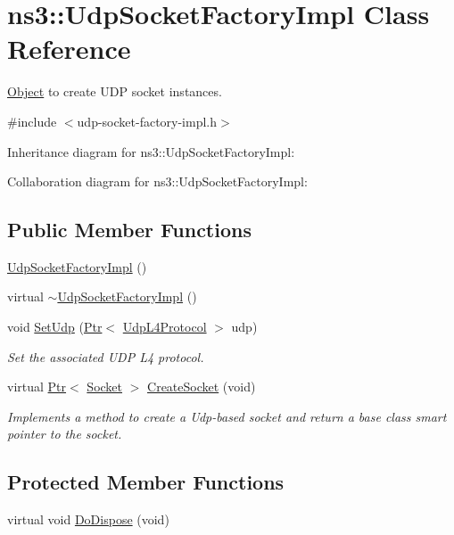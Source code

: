 \hypertarget{classns3_1_1UdpSocketFactoryImpl}{}\section{ns3\+:\+:Udp\+Socket\+Factory\+Impl Class Reference}
\label{classns3_1_1UdpSocketFactoryImpl}


\hyperlink{classns3_1_1Object}{Object} to create U\+DP socket instances.  




{\ttfamily \#include $<$udp-\/socket-\/factory-\/impl.\+h$>$}



Inheritance diagram for ns3\+:\+:Udp\+Socket\+Factory\+Impl\+:


Collaboration diagram for ns3\+:\+:Udp\+Socket\+Factory\+Impl\+:
\subsection*{Public Member Functions}
\begin{DoxyCompactItemize}
\item 
\hyperlink{classns3_1_1UdpSocketFactoryImpl_a0c03197a18f97f350e0b5d4eb5973f3e}{Udp\+Socket\+Factory\+Impl} ()
\item 
virtual \hyperlink{classns3_1_1UdpSocketFactoryImpl_a076a277ff6eaca9e746aa092aa23deac}{$\sim$\+Udp\+Socket\+Factory\+Impl} ()
\item 
void \hyperlink{classns3_1_1UdpSocketFactoryImpl_a12d02f4167d88cf1770189858016b44c}{Set\+Udp} (\hyperlink{classns3_1_1Ptr}{Ptr}$<$ \hyperlink{classns3_1_1UdpL4Protocol}{Udp\+L4\+Protocol} $>$ udp)
\begin{DoxyCompactList}\small\item\em Set the associated U\+DP L4 protocol. \end{DoxyCompactList}\item 
virtual \hyperlink{classns3_1_1Ptr}{Ptr}$<$ \hyperlink{classns3_1_1Socket}{Socket} $>$ \hyperlink{classns3_1_1UdpSocketFactoryImpl_aa01a35d484322a1b855900cdbb9b8a32}{Create\+Socket} (void)
\begin{DoxyCompactList}\small\item\em Implements a method to create a Udp-\/based socket and return a base class smart pointer to the socket. \end{DoxyCompactList}\end{DoxyCompactItemize}
\subsection*{Protected Member Functions}
\begin{DoxyCompactItemize}
\item 
virtual void \hyperlink{classns3_1_1UdpSocketFactoryImpl_a5ce98bf81bc6aeea2987a76cb8e66a9c}{Do\+Dispose} (void)
\end{DoxyCompactItemize}
